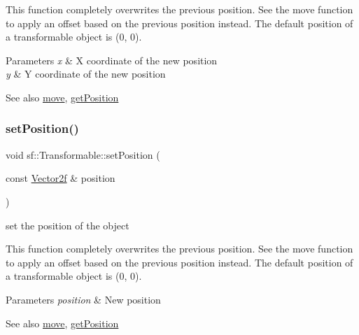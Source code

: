 This function completely overwrites the previous position. See the move function to apply an offset based on the previous position instead. The default position of a transformable object is (0, 0).


\begin{DoxyParams}{Parameters}
{\em x} & X coordinate of the new position \\
\hline
{\em y} & Y coordinate of the new position\\
\hline
\end{DoxyParams}
\begin{DoxySeeAlso}{See also}
\hyperlink{classsf_1_1_transformable_a86b461d6a941ad390c2ad8b6a4a20391}{move}, \hyperlink{classsf_1_1_transformable_a73f9739bc6e74db2cea154bc8e94ec46}{get\+Position} 
\end{DoxySeeAlso}
\mbox{\label{classsf_1_1_transformable_af1a42209ce2b5d3f07b00f917bcd8015}} 
\subsubsection{\texorpdfstring{set\+Position()}{setPosition()}\hspace{0.1cm}{\footnotesize\ttfamily [2/2]}}
{\footnotesize\ttfamily void sf\+::\+Transformable\+::set\+Position (\begin{DoxyParamCaption}\item[{const \hyperlink{classsf_1_1_vector2}{Vector2f} \&}]{position }\end{DoxyParamCaption})}



set the position of the object 

This function completely overwrites the previous position. See the move function to apply an offset based on the previous position instead. The default position of a transformable object is (0, 0).


\begin{DoxyParams}{Parameters}
{\em position} & New position\\
\hline
\end{DoxyParams}
\begin{DoxySeeAlso}{See also}
\hyperlink{classsf_1_1_transformable_a86b461d6a941ad390c2ad8b6a4a20391}{move}, \hyperlink{classsf_1_1_transformable_a73f9739bc6e74db2cea154bc8e94ec46}{get\+Position} 
\end{DoxySeeAlso}
\mbox{\label{classsf_1_1_transformable_a32baf2bf1a74699b03bf8c95030a38ed}} 
